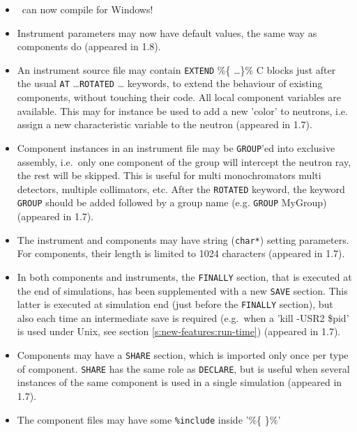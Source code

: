 \begin{itemize}
\item \MCS\ can now compile for Windows!
\item Instrument parameters may now have default values, the same way as components do 
    (appeared in 1.8). 
\item An instrument source file may contain \texttt{EXTEND} \%\{ \ldots \}\% C
    blocks just after the usual \texttt{AT} \ldots \texttt{ROTATED} \ldots
    keywords, to extend the behaviour of existing components, without touching
    their code. All local component variables are  available. This may for
    instance be used to add a new 'color' to neutrons,  i.e. assign a new
    characteristic variable to the neutron (appeared in 1.7).
\item Component instances in an instrument file may be \texttt{GROUP}'ed into 
    exclusive assembly, i.e.\ only one component of the group will intercept
    the neutron ray, the rest will be skipped. This is useful for multi
    monochromators multi detectors, multiple collimators, etc.  After the
    \texttt{ROTATED} keyword, the keyword \texttt{GROUP} should be added
    followed by a group name (e.g. \texttt{GROUP} MyGroup)  (appeared in 1.7).
\item The instrument and components may have string (\verb+char*+) setting
    parameters. For components, their length is limited to 1024 characters
    (appeared in 1.7).  
\item In both components and instruments, the \texttt{FINALLY} section, that is
    executed at the end of simulations, has been supplemented with a new
    \texttt{SAVE} section. This latter is executed at simulation end (just
    before the \texttt{FINALLY} section), but also each time an intermediate
    save is required (e.g.\   when a 'kill -USR2 \$pid' is used under Unix, see
    section \ref{s:new-features:run-time})  (appeared in 1.7). 
      
\item Components may have a \texttt{SHARE} section, which is imported only once
    per type of component. \texttt{SHARE} has the same role as
    \texttt{DECLARE}, but is useful when several instances of the same
    component is used in a single simulation  (appeared in 1.7).
     
\item The component files may have some \texttt{\%include} inside '\%\{ \}\%'

\end{itemize}
